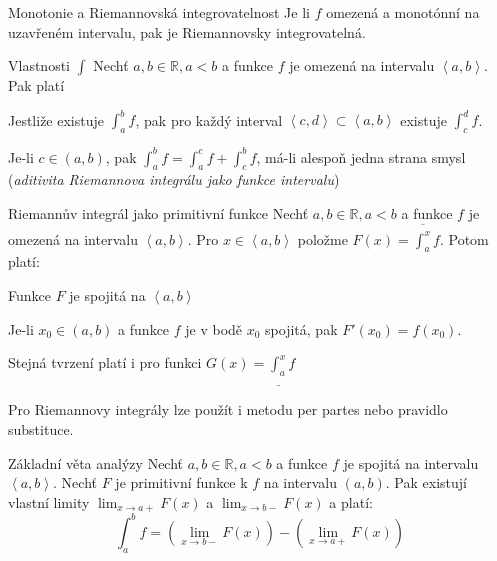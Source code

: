 \begin{vetaN}{Monotonie a Riemannovská integrovatelnost}
Je li $f$ omezená a monotónní na uzavřeném intervalu, pak je Riemannovsky integrovatelná. %
\end{vetaN}

\begin{vetaN}{Vlastnosti $\int$}
Nechť $a,b\in \mathbb{R}, a<b$ a funkce $f$ je omezená na intervalu $\left<a,b\right>$. Pak platí
\begin{penumerate}
	\item Jestliže existuje $\int_a^bf$, pak pro každý interval $\left<c,d\right> \subset \left<a,b\right>$ existuje $\int_c^df$.
	\item Je-li $c \in (a,b)$, pak $\int_a^bf=\int_a^cf+\int_c^bf$, má-li alespoň jedna strana smysl (\emph{aditivita Riemannova integrálu jako funkce intervalu})
\end{penumerate}
\end{vetaN}

\begin{vetaN}{Riemannův integrál jako primitivní funkce}
Nechť $a,b\in \mathbb{R}, a<b$ a funkce $f$ je omezená na intervalu $\left<a,b\right>$. Pro $x \in \left<a,b\right>$ položme $F(x)=\overline{\int_a^x}f$. Potom platí:
\begin{penumerate}
	\item Funkce $F$ je spojitá na $\left<a,b\right>$
	\item Je-li $x_0 \in (a,b)$ a funkce $f$ je v bodě $x_0$ spojitá, pak $F'(x_0)=f(x_0)$.
\end{penumerate}
Stejná tvrzení platí i pro funkci $G(x)=\underline{\int_a^x}f$
\end{vetaN}

\begin{poznamka}
Pro Riemannovy integrály lze použít i metodu per partes nebo pravidlo substituce. %
\end{poznamka}


\begin{vetaN}{Základní věta analýzy}
Nechť $a,b\in \mathbb{R}, a<b$ a funkce $f$ je spojitá na intervalu $\left<a,b\right>$. Nechť $F$ je primitivní funkce k $f$ na intervalu $(a,b)$. Pak existují vlastní limity $\lim_{x\rightarrow a+}F(x)$ a $\lim_{x\rightarrow b-}F(x)$ a platí:
$$\int_a^bf = (\lim_{x\rightarrow b-}F(x))-(\lim_{x\rightarrow a+}F(x))$$
\end{vetaN}


